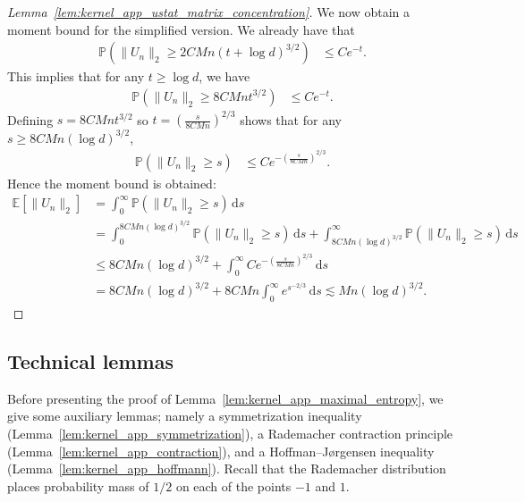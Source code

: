 \documentclass[11pt,lof]{puthesis}
\renewcommand{\P}{\ensuremath{\mathbb{P}}}
\newcommand{\E}{\ensuremath{\mathbb{E}}}
\newcommand{\diff}[1]{\,\mathrm{d}#1}
\theoremstyle{break}
\theoremstyle{proof}
\newtheorem{proof}{Proof}
\begin{document}
\begin{proof}[Lemma~\ref{lem:kernel_app_ustat_matrix_concentration}]
We now obtain a moment bound for the simplified version.
We already have that
%
\begin{align*}
\P\left(
\|U_n\|_2
\geq
2 C M n
(t + \log d)^{3/2}
\right)
&\leq
C e^{-t}.
\end{align*}
%
This implies that for any $t \geq \log d$,
we have
%
\begin{align*}
\P\left(
\|U_n\|_2
\geq
8 C M n
t^{3/2}
\right)
&\leq
C e^{-t}.
\end{align*}
%
Defining
$s = 8 C M n t^{3/2}$
so $t = \left( \frac{s}{8C M n} \right)^{2/3}$
shows that for any $s \geq 8C M n(\log d)^{3/2}$,
%
\begin{align*}
\P\left(
\|U_n\|_2
\geq
s
\right)
&\leq
C e^{-\left( \frac{s}{8C M n} \right)^{2/3}}.
\end{align*}
%
Hence the moment bound is obtained:
%
\begin{align*}
\E\left[
\|U_n\|_2
\right]
&=
\int_0^\infty
\P\left(
\|U_n\|_2
\geq
s
\right)
\diff{s} \\
&=
\int_0^{8C M n(\log d)^{3/2}}
\P\left(
\|U_n\|_2
\geq
s
\right)
\diff{s}
+
\int_{8C M n(\log d)^{3/2}}^\infty
\P\left(
\|U_n\|_2
\geq
s
\right)
\diff{s} \\
&\leq
8C M n(\log d)^{3/2}
+
\int_0^\infty
C e^{-\left( \frac{s}{8C M n} \right)^{2/3}}
\diff{s} \\
&=
8C M n(\log d)^{3/2}
+
8C M n
\int_0^\infty
e^{s^{-2/3}}
\diff{s}
\lesssim
Mn(\log d)^{3/2}.
\end{align*}
\end{proof}

\subsection{Technical lemmas}

Before presenting the proof of
Lemma~\ref{lem:kernel_app_maximal_entropy},
we give some auxiliary lemmas;
namely a symmetrization inequality
(Lemma~\ref{lem:kernel_app_symmetrization}),
a Rademacher contraction principle
(Lemma~\ref{lem:kernel_app_contraction}),
and a Hoffman--J{\o}rgensen inequality
(Lemma~\ref{lem:kernel_app_hoffmann}).
Recall that the Rademacher distribution
places probability mass of $1/2$
on each of the points $-1$ and $1$.
\end{document}

